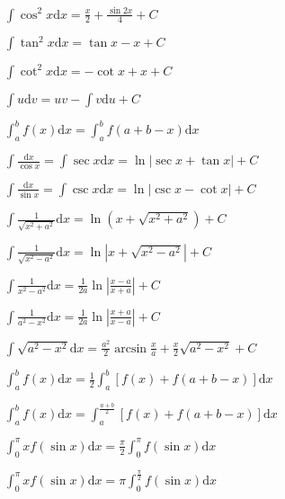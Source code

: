 \begin{multicols}{2}
\begin{spacing}{3}
        \noindent $\displaystyle \int{\cos^2{x}}\mathrm{d}x = \frac{x}{2} + \frac{\sin{2x}}{4} + C$

        \noindent $\displaystyle \int{\tan^2{x}}\mathrm{d}x = \tan{x} - x + C$

        \noindent $\displaystyle \int{\cot^2{x}}\mathrm{d}x = - \cot{x} + x + C$

        \noindent $\displaystyle \int{u}\mathrm{d}v = uv - \int{v}\mathrm{d}u + C$

        \noindent $\displaystyle \int_{a}^{b}{f(x)}\mathrm{d}x = \int_{a}^{b}{f(a + b - x)}\mathrm{d}x$
    \end{spacing}
\end{multicols}

\begin{spacing}{3}
    \noindent $\displaystyle \int{\frac{\mathrm{d}x}{\cos{x}}} = \int{\sec{x}}\mathrm{d}x = \ln{\left| \sec{x} + \tan{x} \right| } + C$

    \noindent $\displaystyle \int{\frac{\mathrm{d}x}{\sin{x}}} = \int{\csc{x}}\mathrm{d}x = \ln{\left| \csc{x} - \cot{x} \right| } + C$

    \noindent $\displaystyle \int{\frac{1}{\sqrt{x^2 + a^2}}}\mathrm{d}x = \ln{(x + \sqrt{x^2 + a ^2})} + C$

    \noindent $\displaystyle \int{\frac{1}{\sqrt{x^2 - a^2}}}\mathrm{d}x = \ln{\left|x + \sqrt{x^2 - a ^2}\right|} + C$

    \noindent $\displaystyle \int{\frac{1}{x^2 - a^2}} \mathrm{d}x = \frac{1}{2a} \ln{\left| \frac{x - a}{x + a} \right|} + C$

    \noindent $\displaystyle \int{\frac{1}{a^2 - x^2}} \mathrm{d}x = \frac{1}{2a} \ln{\left| \frac{x + a}{x - a} \right|} + C$

    \noindent $\displaystyle \int{\sqrt{a^2 - x^2}}\mathrm{d}x = \frac{a^2}{2}\arcsin{\frac{x}{a}} + \frac{x}{2}\sqrt{a^2 - x^2} + C$

    \noindent $\displaystyle \int_{a}^{b}{f(x)}\mathrm{d}x = \frac{1}{2}\int_{a}^{b}{[f(x) + f(a + b - x)]}\mathrm{d}x$

    \noindent $\displaystyle \int_{a}^{b}{f(x)}\mathrm{d}x = \int_{a}^{\frac{a+b}{2}}{[f(x) + f(a + b - x)]}\mathrm{d}x$

    \noindent $\displaystyle \int_{0}^{\pi}{xf(\sin{x})}\mathrm{d}x = \frac{\pi}{2}\int_{0}^{\pi}{f(\sin{x})}\mathrm{d}x$

    \noindent $\displaystyle \int_{0}^{\pi}{xf(\sin{x})}\mathrm{d}x = \pi\int_{0}^{\frac{\pi}{2}}{f(\sin{x})}\mathrm{d}x$


\end{spacing}
